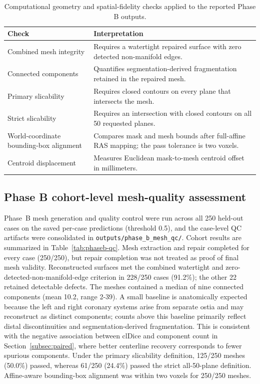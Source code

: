 \documentclass[anonymous]{iopjournal}
\begin{document}
\begin{table}[!htbp]
\centering
\caption{Computational geometry and spatial-fidelity checks applied to the reported Phase B outputs.}
\label{tab:fabrication-readiness-checks}
\begin{threeparttable}
\footnotesize
\begin{tabularx}{0.96\textwidth}{L{0.31\textwidth}Y}
\toprule
\textbf{Check} & \textbf{Interpretation} \\
\midrule
Combined mesh integrity & Requires a watertight repaired surface with zero detected non-manifold edges. \\
Connected components & Quantifies segmentation-derived fragmentation retained in the repaired mesh. \\
Primary slicability & Requires closed contours on every plane that intersects the mesh. \\
Strict slicability & Requires an intersection with closed contours on all 50 requested planes. \\
World-coordinate bounding-box alignment & Compares mask and mesh bounds after full-affine RAS mapping; the pass tolerance is two voxels. \\
Centroid displacement & Measures Euclidean mask-to-mesh centroid offset in millimeters. \\
\bottomrule
\end{tabularx}
\end{threeparttable}
\end{table}


\subsection{Phase B cohort-level mesh-quality assessment}
\label{subsec:phaseb-plan}

Phase~B mesh generation and quality control were run across all 250 held-out cases on the saved per-case predictions (threshold 0.5), and the case-level QC artifacts were consolidated in \texttt{outputs/phase\_b\_mesh\_qc/}. Cohort results are summarized in Table~\ref{tab:phaseb-qc}. Mesh extraction and repair completed for every case (250/250), but repair completion was not treated as proof of final mesh validity. Reconstructed surfaces met the combined watertight and zero-detected-non-manifold-edge criterion in 228/250 cases (91.2\%); the other 22 retained detectable defects. The meshes contained a median of nine connected components (mean 10.2, range 2-39). A small baseline is anatomically expected because the left and right coronary systems arise from separate ostia and may reconstruct as distinct components; counts above this baseline primarily reflect distal discontinuities and segmentation-derived fragmentation. This is consistent with the negative association between clDice and component count in Section~\ref{subsec:paired}, where better centerline recovery corresponds to fewer spurious components. Under the primary slicability definition, 125/250 meshes (50.0\%) passed, whereas 61/250 (24.4\%) passed the strict all-50-plane definition. Affine-aware bounding-box alignment was within two voxels for 250/250 meshes.
\end{document}

